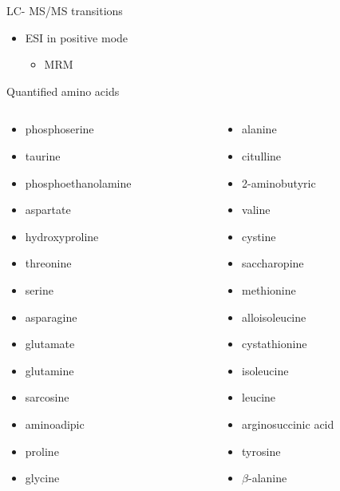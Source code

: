 \documentclass[presentation, smaller]{beamer}
\begin{document}
\begin{frame}[label={sec:orgheadline27}]{LC- MS/MS transitions}
\begin{itemize}
\item ESI in positive mode
\begin{itemize}
\item MRM
\end{itemize}
\end{itemize}

\begin{block}{Quantified amino acids}
\scriptsize
\begin{columns}
\begin{column}{0.3\columnwidth}
\begin{itemize}
\item phosphoserine
\item taurine
\item phosphoethanolamine
\item aspartate
\item hydroxyproline
\item threonine
\item serine
\item asparagine
\item glutamate
\item glutamine
\item sarcosine
\item aminoadipic
\item proline
\item glycine
\end{itemize}
\end{column}

\begin{column}{0.3\columnwidth}
\begin{itemize}
\item alanine
\item citulline
\item 2-aminobutyric
\item valine
\item cystine
\item saccharopine
\item methionine
\item alloisoleucine
\item cystathionine
\item isoleucine
\item leucine
\item arginosuccinic acid
\item tyrosine
\item \(\beta\)-alanine
\end{itemize}
\end{column}


\end{columns}
\end{block}
\end{frame}
\end{document}
